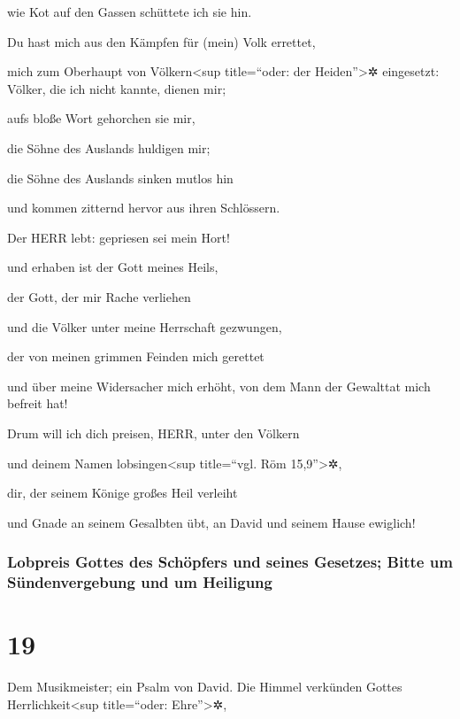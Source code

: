 wie Kot auf den Gassen schüttete ich sie hin.

Du hast mich aus den Kämpfen für (mein) Volk errettet,

mich zum Oberhaupt von Völkern\textless sup title=``oder: der
Heiden''\textgreater✲ eingesetzt: Völker, die ich nicht kannte, dienen
mir;

aufs bloße Wort gehorchen sie mir,

die Söhne des Auslands huldigen mir;

die Söhne des Auslands sinken mutlos hin

und kommen zitternd hervor aus ihren Schlössern.

Der HERR lebt: gepriesen sei mein Hort!

und erhaben ist der Gott meines Heils,

der Gott, der mir Rache verliehen

und die Völker unter meine Herrschaft gezwungen,

der von meinen grimmen Feinden mich gerettet

und über meine Widersacher mich erhöht, von dem Mann der Gewalttat mich
befreit hat!

Drum will ich dich preisen, HERR, unter den Völkern

und deinem Namen lobsingen\textless sup title=``vgl. Röm
15,9''\textgreater✲,

dir, der seinem Könige großes Heil verleiht

und Gnade an seinem Gesalbten übt, an David und seinem Hause ewiglich!

\hypertarget{lobpreis-gottes-des-schuxf6pfers-und-seines-gesetzes-bitte-um-suxfcndenvergebung-und-um-heiligung}{%
\subsubsection{Lobpreis Gottes des Schöpfers und seines Gesetzes; Bitte
um Sündenvergebung und um
Heiligung}\label{lobpreis-gottes-des-schuxf6pfers-und-seines-gesetzes-bitte-um-suxfcndenvergebung-und-um-heiligung}}

\hypertarget{section-18}{%
\section{19}\label{section-18}}

Dem Musikmeister; ein Psalm von David. Die
Himmel verkünden Gottes Herrlichkeit\textless sup title=``oder:
Ehre''\textgreater✲,

